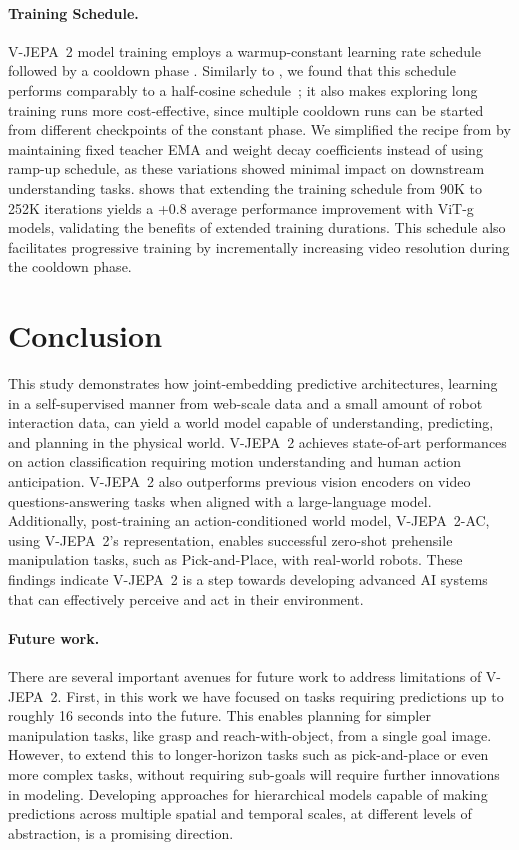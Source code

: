 \documentclass[]{kling/kling}
\newcommand{\model}{V-JEPA~2\xspace}
\newcommand{\acModel}{V-JEPA~2-AC\xspace}
\begin{document}
\paragraph{\bf Training Schedule.}
\model model training employs a warmup-constant learning rate schedule followed by a cooldown phase \citep{zhai2022scaling, hagele2024scaling}. Similarly to \citet{hagele2024scaling}, we found that this schedule performs comparably to a half-cosine schedule~\citep{loshchilov2016sgdr}; it also makes exploring long training runs more cost-effective, since multiple cooldown runs can be started from different checkpoints of the constant phase.
We simplified the recipe from \citet{bardes2024revisiting} by maintaining fixed teacher EMA and weight decay coefficients instead of using ramp-up schedule, as these variations showed minimal impact on downstream understanding tasks.  shows that extending the training schedule from 90K to 252K iterations yields a +0.8 average performance improvement with ViT-g models, validating the benefits of extended training durations. This schedule also facilitates progressive training by incrementally increasing video resolution during the cooldown phase.



\section{Conclusion}
\label{section:conclusion}

This study demonstrates how joint-embedding predictive architectures, learning in a self-supervised manner from web-scale data and a small amount of robot interaction data, can yield a world model capable of understanding, predicting, and planning in the physical world.
\model achieves state-of-art performances on action classification requiring motion understanding and human action anticipation. \model also outperforms previous vision encoders on video questions-answering tasks when aligned with a large-language model. Additionally, post-training an action-conditioned world model, \acModel, using \model's representation, enables successful zero-shot prehensile manipulation tasks, such as Pick-and-Place, with real-world robots. These findings indicate \model is a step towards developing advanced AI systems that can effectively perceive and act in their environment.

\paragraph{\bf Future work.} There are several important avenues for future work to address limitations of \model. First, in this work we have focused on tasks requiring predictions up to roughly 16 seconds into the future. This enables planning for simpler manipulation tasks, like grasp and reach-with-object, from a single goal image. However, to extend this to longer-horizon tasks such as pick-and-place or even more complex tasks, without requiring sub-goals will require further innovations in modeling. Developing approaches for hierarchical models capable of making predictions across multiple spatial and temporal scales, at different levels of abstraction, is a promising direction.
\end{document}
